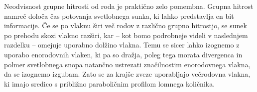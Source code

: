 Neodvisnost grupne hitrosti od roda je praktično zelo pomembna. 
Grupna hitrost namreč določa čas potovanja svetlobnega sunka, ki
lahko predstavlja en bit informacije. Če se po vlaknu širi več
rodov z različno grupno hitrostjo, se sunek po prehodu skozi
vlakno razširi, kar -- kot bomo podrobneje videli v naslednjem razdelku -- omejuje 
uporabno dolžino vlakna. Temu se sicer lahko izognemo z uporabo enorodovnih vlaken,
ki pa so dražja, poleg tega morata divergenca in polmer svetlobnega snopa 
natančno ustrezati značilnostim enorodovnega vlakna, da se izognemo izgubam. 
Zato se za krajše zveze uporabljajo večrodovna vlakna, ki imajo sredico s 
približno paraboličnim profilom lomnega količnika.

% 
% 
